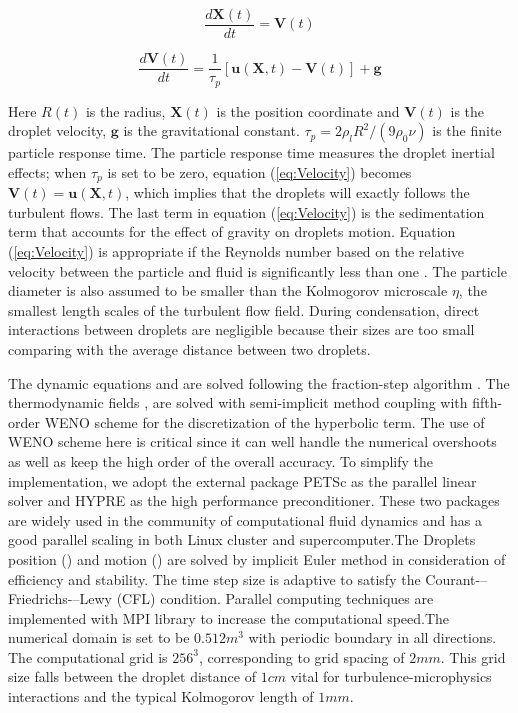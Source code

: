 \begin{equation}
\frac{d\mathbf{X}(t)}{dt}=\mathbf{V}(t)\label{eq:Coords}
\end{equation}


\begin{equation}
\frac{d\mathbf{V}(t)}{dt}=\frac{1}{\tau_{p}}[\mathbf{u}(\mathbf{X},t)-\mathbf{V}(t)]+\mathbf{g}\label{eq:Velocity}
\end{equation}

Here $R(t)$ is the radius, $\mathbf{X}(t)$ is the position coordinate and
$\mathbf{V}(t)$ is the droplet velocity, $\mathbf{g}$ is the gravitational
constant. $\tau_{p}=2\rho_{l}R^{2}/(9\rho_{0}\nu)$ is the finite particle
response time. The particle response time measures the droplet inertial
effects; when $\tau_{p}$ is set to be zero, equation (\ref{eq:Velocity})
becomes $\mathbf{V}(t)=\mathbf{u}(\mathbf{X},t)$, which implies that the
droplets will exactly follows the turbulent flows. The last term in equation
(\ref{eq:Velocity}) is the sedimentation term that accounts for the effect of
gravity on droplets motion. Equation (\ref{eq:Velocity}) is appropriate if the
Reynolds number based on the relative velocity between the particle and fluid
is significantly less than one \cite{Eaton94}. The particle diameter is also
assumed to be smaller than the Kolmogorov microscale $\eta$, the smallest
length scales of the turbulent flow field. During condensation, direct
interactions between droplets are negligible because their sizes are too small
comparing with the average distance between two droplets.

The dynamic equations  and  are solved following the
fraction-step algorithm \cite{Brown2001}. The thermodynamic fields
,  are solved with semi-implicit method coupling with
fifth-order WENO scheme for the discretization of the hyperbolic term. The use
of WENO scheme here is critical since it can well handle the numerical
overshoots as well as keep the high order of the overall accuracy. To simplify
the implementation, we adopt the external package PETSc \cite{petsc_cite} as
the parallel linear solver and HYPRE \cite{hypre_cite} as the high performance
preconditioner. These two packages are widely used in the community of
computational fluid dynamics and has a good parallel scaling in both Linux
cluster and supercomputer.The Droplets position () and motion
() are solved by implicit Euler method in consideration of
efficiency and stability. The time step size is adaptive to satisfy the
Courant-–Friedrichs-–Lewy (CFL) condition. Parallel computing techniques are
implemented with MPI library to increase the computational speed.The numerical
domain is set to be $0.512m^{3}$ with periodic boundary in all directions. The
computational grid is $256^{3}$, corresponding to grid spacing of $2mm$. This
grid size falls between the droplet distance of $1cm$ vital for
turbulence-microphysics interactions and the typical Kolmogorov length of
$1mm$.

